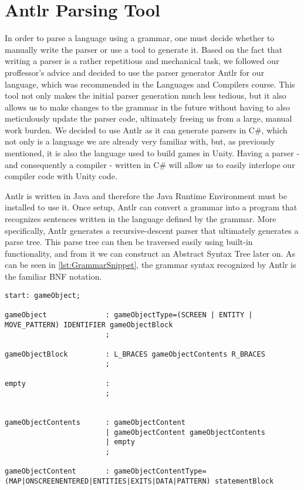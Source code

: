 \section{Antlr Parsing Tool}
In order to parse a language using a grammar, one must decide whether to manually write the parser or use a tool to generate it\cite{crafting_a_compiler}.
Based on the fact that writing a parser is a rather repetitious and mechanical task, we followed our proffessor's advice and decided to use the parser generator Antlr for our language, which was recommended in the Languages and Compilers course. 
This tool not only makes the initial parser generation much less tedious, but it also allows us to make changes to the grammar in the future without having to also meticulously update the parser code, ultimately freeing us from a large, manual work burden.
We decided to use Antlr as it can generate parsers in C\#, which not only is a language we are already very familiar with, but, as previously mentioned, it is also the language used to build games in Unity. Having a parser - and consequently a compiler - written in C\# will allow us to easily interlope our compiler code with Unity code.


Antlr is written in Java and therefore the Java Runtime Environment must be installed to use it. 
Once setup, Antlr can convert a grammar into a program that recognizes sentences written in the language defined by the grammar.
More specifically, Antlr generates a recursive-descent parser that ultimately generates a parse tree.
This parse tree can then be traversed easily using built-in functionality, and from it we can construct an Abstract Syntax Tree later on.
As can be seen in \ref{lst:GrammarSnippet}, the grammar syntax recognized by Antlr is the familiar BNF notation.


\begin{lstlisting}[caption={A snippet of the \dazel{} grammar used by Antlr to generate the parser}, label={lst:GrammarSnippet}]
start: gameObject;

gameObject              : gameObjectType=(SCREEN | ENTITY | MOVE_PATTERN) IDENTIFIER gameObjectBlock
						;
						
gameObjectBlock         : L_BRACES gameObjectContents R_BRACES
						;

empty                   : 
						;


gameObjectContents      : gameObjectContent
						| gameObjectContent gameObjectContents
						| empty
						;

gameObjectContent       : gameObjectContentType=(MAP|ONSCREENENTERED|ENTITIES|EXITS|DATA|PATTERN) statementBlock 
\end{lstlisting}

